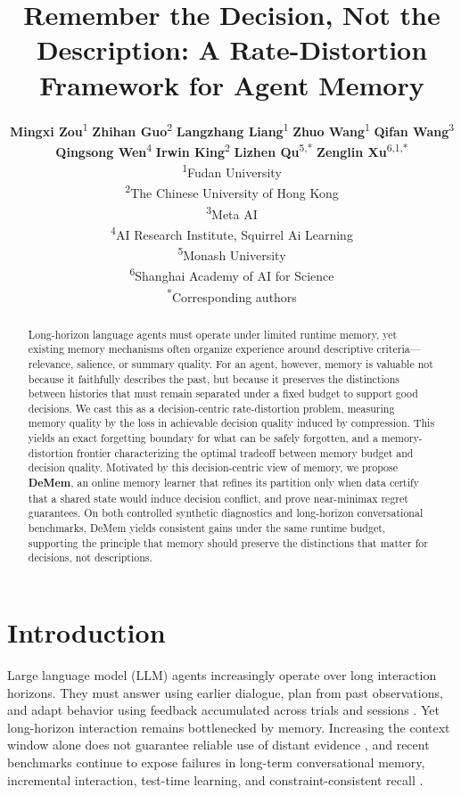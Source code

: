 \documentclass{article}
\title{Remember the Decision, Not the Description: A Rate-Distortion Framework for Agent Memory}
\author{%
\textbf{Mingxi Zou}\textsuperscript{1} \quad
\textbf{Zhihan Guo}\textsuperscript{2} \quad
\textbf{Langzhang Liang}\textsuperscript{1} \quad
\textbf{Zhuo Wang}\textsuperscript{1} \quad
\textbf{Qifan Wang}\textsuperscript{3} \\
\textbf{Qingsong Wen}\textsuperscript{4} \quad
\textbf{Irwin King}\textsuperscript{2} \quad
\textbf{Lizhen Qu}\textsuperscript{5,*} \quad
\textbf{Zenglin Xu}\textsuperscript{6,1,*} \\[0.5em]
\textsuperscript{1}Fudan University \\
\textsuperscript{2}The Chinese University of Hong Kong \\
\textsuperscript{3}Meta AI \\
\textsuperscript{4}AI Research Institute, Squirrel Ai Learning \\
\textsuperscript{5}Monash University \\
\textsuperscript{6}Shanghai Academy of AI for Science \\
\textsuperscript{*}Corresponding authors
}
\theoremstyle{plain}
\theoremstyle{definition}
\theoremstyle{remark}
\begin{document}
\maketitle

\begin{abstract}
Long-horizon language agents must operate under limited runtime memory, yet existing memory mechanisms often organize experience around descriptive criteria—relevance, salience, or summary quality. 
For an agent, however, memory is valuable not because it faithfully describes
the past, but because it preserves the distinctions between histories that
must remain separated under a fixed budget to support good decisions.
We cast this as a
decision-centric rate-distortion problem, measuring memory quality by the loss in
achievable decision quality induced by compression. 
This yields an exact forgetting
boundary for what can be safely forgotten, and a memory-distortion frontier characterizing the optimal tradeoff between memory budget and decision quality. 
Motivated by this decision-centric view of memory, we propose \textbf{DeMem}, an online memory learner that refines
its partition only when data certify that a shared state would induce decision
conflict, and prove near-minimax regret guarantees. 
On both controlled synthetic diagnostics and long-horizon conversational
benchmarks, DeMem yields consistent gains under the same runtime budget,
supporting the principle that memory should preserve the distinctions that
matter for decisions, not descriptions.
\end{abstract}
\vspace{-0.5em}

\section{Introduction}
\vspace{-0.5em}
Large language model (LLM) agents increasingly operate over long interaction
horizons. They must answer using earlier dialogue, plan from past observations,
and adapt behavior using feedback accumulated across trials and sessions
\citep{yao2023reactsynergizingreasoningacting,shinn2023reflexionlanguageagentsverbal}.
Yet long-horizon interaction remains bottlenecked by memory. Increasing the
context window alone does not guarantee reliable use of distant evidence
\citep{liu2023lostmiddlelanguagemodels}, and recent benchmarks continue to
expose failures in long-term conversational memory, incremental interaction,
test-time learning, and constraint-consistent recall
\citep{maharana-etal-2024-evaluating,wu2025longmemevalbenchmarkingchatassistants,
hu2026evaluating,li2026locomoplusbeyondfactualcognitivememory}.
\end{document}

